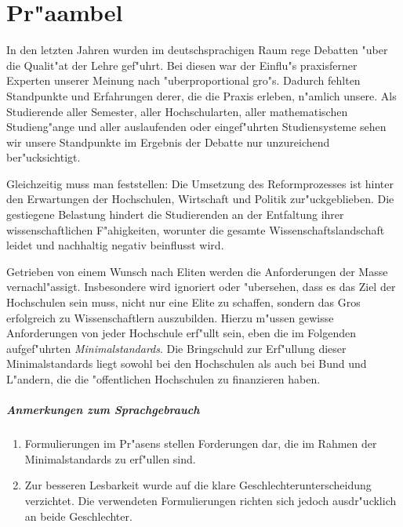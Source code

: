 \chapter*{Pr"aambel}

In den letzten Jahren wurden im deutschsprachigen Raum rege
Debatten "uber die Qualit"at der Lehre gef"uhrt.
Bei diesen war der Einflu"s praxisferner Experten unserer Meinung nach "uberproportional gro"s.
Dadurch fehlten Standpunkte und Erfahrungen derer, die
die Praxis erleben, n"amlich unsere. Als Studierende
aller Semester, aller Hochschularten, aller mathematischen Studieng"ange
und aller auslaufenden oder eingef"uhrten Studiensysteme sehen
wir unsere Standpunkte im Ergebnis der Debatte nur unzureichend
ber"ucksichtigt.

Gleichzeitig muss man feststellen: Die Umsetzung des Reformprozesses
ist hinter den Erwartungen der Hochschulen, Wirtschaft und Politik
zur"uckgeblieben. Die gestiegene Belastung hindert die Studierenden
an der Entfaltung ihrer wissenschaftlichen F"ahigkeiten, worunter
die gesamte Wissenschaftslandschaft leidet und nachhaltig negativ
beinflusst wird.

Getrieben von einem Wunsch nach Eliten werden die Anforderungen der
Masse vernachl"assigt. Insbesondere wird ignoriert oder "ubersehen,
dass es das Ziel der Hochschulen sein muss, nicht nur eine Elite zu
schaffen, sondern das Gros erfolgreich zu Wissenschaftlern auszubilden.
Hierzu m"ussen gewisse Anforderungen von jeder Hochschule erf"ullt
sein, eben die im Folgenden aufgef"uhrten \emph{Minimalstandards}.
Die Bringschuld zur Erf"ullung dieser Minimalstandards liegt sowohl
bei den Hochschulen als auch bei Bund und L"andern, die die
"offentlichen Hochschulen zu finanzieren haben.

\paragraph{Anmerkungen zum Sprachgebrauch}\begin{enumerate}
\item Formulierungen im Pr"asens stellen Forderungen dar, die im
	Rahmen der Minimalstandards zu erf"ullen sind.
\item Zur besseren Lesbarkeit wurde auf die klare Geschlechterunterscheidung
	verzichtet. Die verwendeten Formulierungen richten sich
	jedoch ausdr"ucklich an beide Geschlechter.
\end{enumerate}
